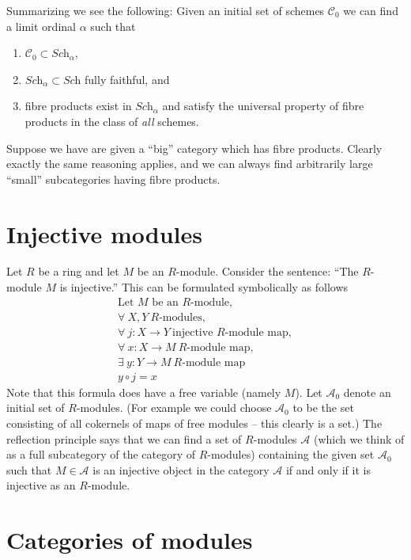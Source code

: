 Summarizing we see the following: Given an initial set
of schemes $\mathcal{C}_0$ we can find a limit ordinal
$\alpha$ such that
\begin{enumerate}
\item $\mathcal{C}_0 \subset \textit{Sch}_\alpha$,
\item $\textit{Sch}_\alpha \subset \textit{Sch}$ fully faithful, and
\item fibre products exist in $\textit{Sch}_\alpha$ and satisfy
the universal property of fibre products in the class of {\it all} schemes.
\end{enumerate}

\medskip\noindent
Suppose we have are given a ``big'' category which has fibre products.
Clearly exactly the same reasoning applies, and we can always
find arbitrarily large ``small'' subcategories having fibre
products.

\section{Injective modules}
\label{section-injective-modules}

\noindent
Let $R$ be a ring and let $M$ be an $R$-module.
Consider the sentence: ``The $R$-module $M$ is injective.''
This can be formulated symbolically as follows
\begin{eqnarray*}
\text{Let }M \text{ be an $R$-module},\\
\forall\ X,Y\ \text{$R$-modules},\\
\forall\ j : X\to Y\ \text{injective $R$-module map},\\
\forall\ x : X\to M\ \text{$R$-module map},\\
\exists\ y : Y\to M\ \text{$R$-module map}\\
y \circ j = x
\end{eqnarray*}
Note that this formula does have a free variable (namely $M$).
Let $\mathcal{A}_0$ denote an initial set of $R$-modules.
(For example we could choose $\mathcal{A}_0$ to be the set
consisting of all cokernels of maps of free modules -- this
clearly is a set.)
The reflection principle says that we can find a set
of $R$-modules $\mathcal{A}$ (which we think of as a full subcategory
of the category of $R$-modules) containing the given set $\mathcal{A}_0$
such that $M \in \mathcal{A}$ is an injective
object in the category $\mathcal{A}$ if and only if
it is injective as an $R$-module. 

\section{Categories of modules}
\label{section-categories-modules}

